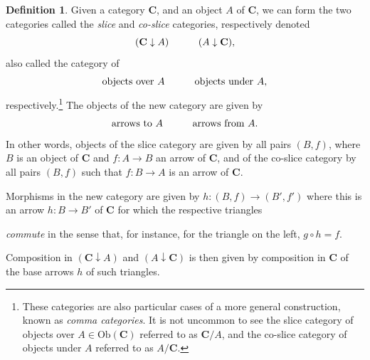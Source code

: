 \documentclass[11pt]{book}
\theoremstyle{definition}
\theoremstyle{definition}
\newtheorem{definition}{Definition}[section]
\theoremstyle{definition}
\theoremstyle{theorem}
\theoremstyle{definition}
\begin{document}
		\begin{definition}
			Given a category $\textbf{C}$, and an object $A$ of $\textbf{C}$, we can form the two categories called the \textit{slice} and \textit{co-slice} categories,   respectively denoted 
			\begin{equation*}
			(\textbf{C} \downarrow A) \hspace*{3em} (A \downarrow \textbf{C}),
			\end{equation*}
			also called the category of
			\begin{equation*} 
			\text{objects over } A \hspace*{3em} \text{objects under } A,
			\end{equation*}  
			respectively.\footnote{These categories are also particular cases of a more general construction, known as \textit{comma categories}. It is not uncommon to see the slice category of objects over $A \in \text{Ob}(\textbf{C})$ referred to as $\textbf{C} / A$, and the co-slice category of objects under $A$ referred to as $A / \textbf{C}$.} The objects of the new category are given by 
			\begin{equation*}
				\text{arrows to } A \hspace*{3em} \text{arrows from } A.
			\end{equation*}  
			In other words, objects of the slice category are given by all pairs $(B, f)$, where $B$ is an object of $\textbf{C}$ and $f: A \rightarrow B$ an arrow of $\textbf{C}$, and of the co-slice category by all pairs $(B, f)$ such that $f: B \rightarrow A$ is an arrow of $\textbf{C}$. \par 
			Morphisms in the new category are given by $h: (B, f) \rightarrow (B', f')$ where this is an arrow $h: B \rightarrow B'$ of $\textbf{C}$ for which the respective triangles 
				\begin{center}
				\end{center} 
				\par \noindent 
				\textit{commute} in the sense that, for instance, for the triangle on the left, $g \circ h = f$. \par 
			Composition in $(\textbf{C} \downarrow A)$ and $(A \downarrow \textbf{C})$ is then given by composition in $\textbf{C}$ of the base arrows $h$ of such triangles.  
		\end{definition}  
\end{document}

